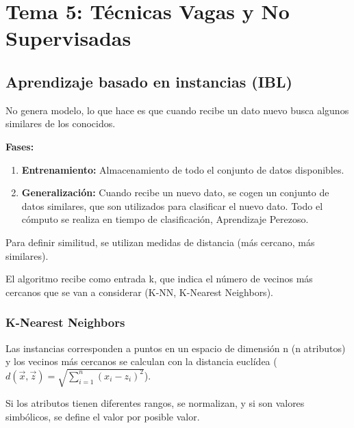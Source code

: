 \documentclass[12pt, twoside, openright]{report} %
\begin{document}
\chapter{Tema 5: Técnicas Vagas y No Supervisadas}
\section{Aprendizaje basado en instancias (IBL)}
No genera modelo, lo que hace es que cuando recibe un dato nuevo busca algunos similares de los conocidos.
\begin{figure}[H]
	{\def\svgwidth{.8\textwidth}
		}
\end{figure}
\textbf{Fases:}
\begin{enumerate}
	\item \textbf{Entrenamiento:} Almacenamiento de todo el conjunto de datos disponibles.
	\item \textbf{Generalización:} Cuando recibe un nuevo dato, se cogen un conjunto de datos similares, que son utilizados para clasificar el nuevo dato. Todo el cómputo se realiza en tiempo de clasificación, Aprendizaje Perezoso.
\end{enumerate}
Para definir similitud, se utilizan medidas de distancia (más cercano, más similares).

El algoritmo recibe como entrada k, que indica el número de vecinos más cercanos que se van a considerar (K-NN, K-Nearest Neighbors).

\subsection{K-Nearest Neighbors}
Las instancias corresponden a puntos en un espacio de dimensión n (n atributos) y los vecinos más cercanos se calculan con la distancia euclídea ($d\left( \vec{x},\vec{z}\right)   = \sqrt {\sum _{i=1}^{n}  \left( x_{i}-z_{i}\right)^2 }$).

Si los atributos tienen diferentes rangos, se normalizan, y si son valores simbólicos, se define el valor por posible valor.
\end{document}
